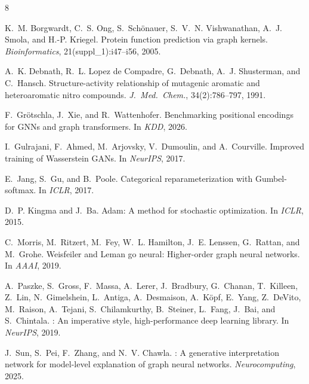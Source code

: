 \documentclass[12pt,a4paper]{article}
\begin{document}

\begin{thebibliography}{8}

K.~M. Borgwardt, C.~S. Ong, S.~Sch\"{o}nauer, S.~V.~N. Vishwanathan, A.~J. Smola, and H.-P. Kriegel.
\newblock Protein function prediction via graph kernels.
\newblock \emph{Bioinformatics}, 21(suppl\_1):i47--i56, 2005.

A.~K. Debnath, R.~L. {Lopez de Compadre}, G.~Debnath, A.~J. Shusterman, and C.~Hansch.
\newblock Structure-activity relationship of mutagenic aromatic and heteroaromatic nitro compounds.
\newblock \emph{J.\ Med.\ Chem.}, 34(2):786--797, 1991.

F.~Gr\"otschla, J.~Xie, and R.~Wattenhofer.
\newblock Benchmarking positional encodings for {GNN}s and graph transformers.
\newblock In \emph{KDD}, 2026.

I.~Gulrajani, F.~Ahmed, M.~Arjovsky, V.~Dumoulin, and A.~Courville.
\newblock Improved training of {W}asserstein {GAN}s.
\newblock In \emph{NeurIPS}, 2017.

E.~Jang, S.~Gu, and B.~Poole.
\newblock Categorical reparameterization with {G}umbel-softmax.
\newblock In \emph{ICLR}, 2017.

D.~P. Kingma and J.~Ba.
\newblock Adam: A method for stochastic optimization.
\newblock In \emph{ICLR}, 2015.

C.~Morris, M.~Ritzert, M.~Fey, W.~L. Hamilton, J.~E. Lenssen, G.~Rattan, and M.~Grohe.
\newblock Weisfeiler and {L}eman go neural: Higher-order graph neural networks.
\newblock In \emph{AAAI}, 2019.

A.~Paszke, S.~Gross, F.~Massa, A.~Lerer, J.~Bradbury, G.~Chanan, T.~Killeen, Z.~Lin, N.~Gimelshein, L.~Antiga, A.~Desmaison, A.~K\"opf, E.~Yang, Z.~DeVito, M.~Raison, A.~Tejani, S.~Chilamkurthy, B.~Steiner, L.~Fang, J.~Bai, and S.~Chintala.
: An imperative style, high-performance deep learning library.
\newblock In \emph{NeurIPS}, 2019.

J.~Sun, S.~Pei, F.~Zhang, and N.~V. Chawla.
: A generative interpretation network for model-level explanation of graph neural networks.
\newblock \emph{Neurocomputing}, 2025.

\end{thebibliography}
\end{document}
